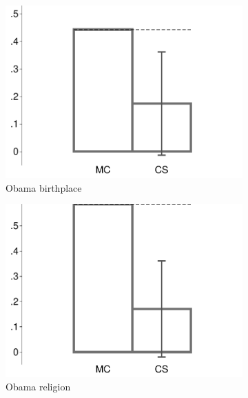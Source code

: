 \begin{figure}[t]
	\caption{Confidence Scoring vs. CUD (MTurk 1)}	
	\centering
	\begin{subfigure}{.325\textwidth}\centering
		\includegraphics[width=\textwidth]{../figs/confidence_score_ccd_cud_rw_birth_study1.pdf}
		\caption{Obama birthplace}
	\end{subfigure}
	\hfill
	\begin{subfigure}{.325\textwidth}\centering
		\includegraphics[width=\textwidth]{../figs/confidence_score_ccd_cud_rw_religion_study1.pdf}
		\caption{Obama religion}
	\end{subfigure}	
	\hfill
	\begin{subfigure}{.325\textwidth}\centering

\end{subfigure}
\end{figure}
